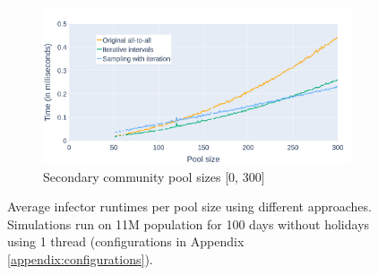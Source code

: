 \begin{figure}
\begin{subfigure}{.8\linewidth}
    \end{subfigure}
    \begin{subfigure}{.8\linewidth}
        \centering
        \includegraphics[width=\textwidth]{4 - Sampling/fig/sampling_with_iteration/times_avg_swi_pType_secondary.png}
        \caption{Secondary community pool sizes [0, 300]}
        \label{fig:times_avg_swi_pType_secondary}
    \end{subfigure}
    \caption{Average infector runtimes per pool size using different approaches. Simulations run on 11M population for 100 days without holidays using 1 thread (configurations in Appendix \ref{appendix:configurations}).}
\end{figure}
